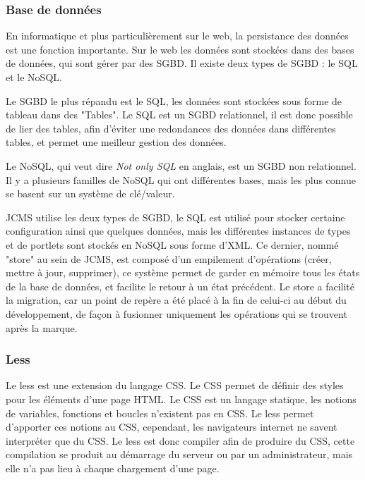 \documentclass[12pt,a4paper]{article}
\begin{document}
\subsubsection{Base de données}
En informatique et plus particulièrement sur le web, la persistance des données est une fonction importante. Sur le web les données sont stockées dans des bases de données, qui sont gérer par des \gls{SGBD}. Il existe deux types de \gls{SGBD} : le SQL et le NoSQL.\par 
\medskip
Le \gls{SGBD} le plus répandu est le SQL, les données sont stockées sous forme de tableau dans des "Tables". Le SQL est un \gls{SGBD} relationnel, il est donc possible de lier des tables, afin d'éviter une redondances des données dans différentes tables, et permet une meilleur gestion des données.\par
\medskip
Le NoSQL, qui veut dire \textit{Not only SQL} en anglais, est un \gls{SGBD} non relationnel. Il y a plusieurs familles de NoSQL qui ont différentes bases, mais les plus connue se basent sur un système de clé/valeur.\par
\medskip
\gls{JCMS} utilise les deux types de \gls{SGBD}, le SQL est utilisé pour stocker certaine configuration ainsi que quelques données, mais les différentes instances de types et de portlets sont stockés en NoSQL sous forme d'XML. Ce dernier, nommé "store" au sein de \gls{JCMS}, est composé d'un empilement d'opérations (créer, mettre à jour, supprimer), ce système permet de garder en mémoire tous les états de la base de données, et facilite le retour à un état précédent. Le store a facilité la migration, car un point de repère a été placé à la fin de celui-ci au début du développement, de façon à fusionner uniquement les opérations qui se trouvent après la marque.\par

\subsubsection{Less}
Le less est une extension du langage CSS. Le CSS permet de définir des styles pour les éléments d'une page HTML. Le CSS est un langage statique, les notions de variables, fonctions et boucles n'existent pas en CSS. Le less permet d'apporter ces notions au CSS, cependant, les navigateurs internet ne savent interpréter que du CSS. Le less est donc compiler afin de produire du CSS, cette compilation se produit au démarrage du serveur ou par un administrateur, mais elle n'a pas lieu à chaque chargement d'une page.\par 
\end{document}
